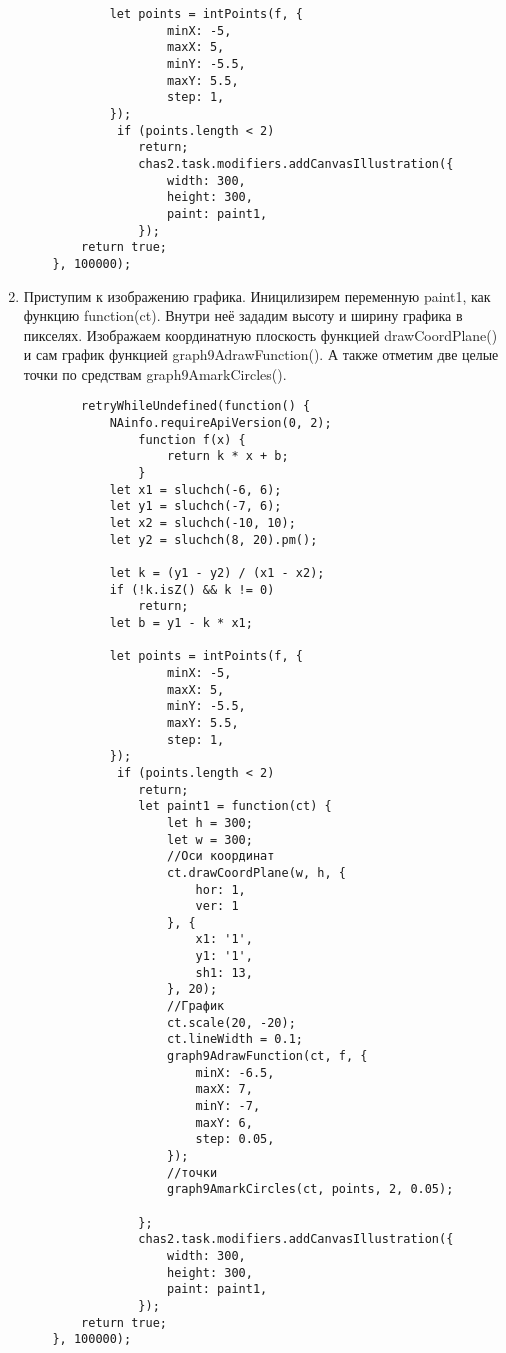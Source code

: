 \begin{enumerate}
\begin{verbatim}
            let points = intPoints(f, {
		            minX: -5,
		            maxX: 5,
		            minY: -5.5,
		            maxY: 5.5,
		            step: 1,
	        });
	         if (points.length < 2)
		        return;
                chas2.task.modifiers.addCanvasIllustration({
                    width: 300,
                    height: 300,
                    paint: paint1,
                });
        return true;
    }, 100000);
        \end{verbatim}
    \item Приступим к изображению графика. Иницилизирем переменную paint1, как функцию function(ct). Внутри неё зададим высоту и ширину графика в пикселях.
          Изображаем координатную плоскость функцией drawCoordPlane() и сам график функцией graph9AdrawFunction(). А также отметим две целые точки по средствам graph9AmarkCircles().
          \begin{verbatim}
        retryWhileUndefined(function() {
            NAinfo.requireApiVersion(0, 2);
                function f(x) {
                    return k * x + b;
                }
            let x1 = sluchch(-6, 6);
            let y1 = sluchch(-7, 6);
            let x2 = sluchch(-10, 10);
            let y2 = sluchch(8, 20).pm();
    
            let k = (y1 - y2) / (x1 - x2);
            if (!k.isZ() && k != 0)
                return;
            let b = y1 - k * x1;

            let points = intPoints(f, {
		            minX: -5,
		            maxX: 5,
		            minY: -5.5,
		            maxY: 5.5,
		            step: 1,
	        });
	         if (points.length < 2)
		        return;
                let paint1 = function(ct) {
                    let h = 300;
                    let w = 300;
                    //Оси координат
                    ct.drawCoordPlane(w, h, {
                        hor: 1,
                        ver: 1
                    }, {
                        x1: '1',
                        y1: '1',
                        sh1: 13,
                    }, 20);
                    //График
                    ct.scale(20, -20);
                    ct.lineWidth = 0.1;
                    graph9AdrawFunction(ct, f, {
                        minX: -6.5,
                        maxX: 7,
                        minY: -7,
                        maxY: 6,
                        step: 0.05,
                    });
                    //точки
                    graph9AmarkCircles(ct, points, 2, 0.05);

                };
                chas2.task.modifiers.addCanvasIllustration({
                    width: 300,
                    height: 300,
                    paint: paint1,
                });
        return true;
    }, 100000);
        \end{verbatim}
\end{enumerate}


